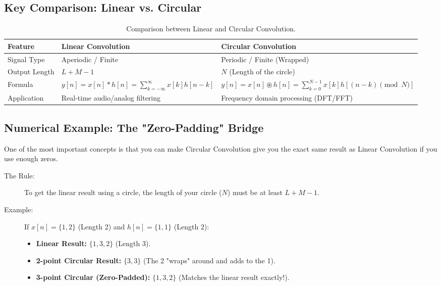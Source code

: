 \documentclass[12pt,a4paper]{article}
\begin{document}
\subsection*{Key Comparison: Linear vs. Circular}
\begin{table}[h!]
\centering
\begin{tabularx}{\textwidth}{|l|X|X|}
\hline
\textbf{Feature} & \textbf{Linear Convolution} & \textbf{Circular Convolution} \\ \hline
Signal Type & Aperiodic / Finite & Periodic / Finite (Wrapped) \\ \hline
Output Length & \(L + M - 1\) & \(N\) (Length of the circle) \\ \hline
Formula & \(y[n] = x[n] * h[n] = \sum_{k=-\infty}^{\infty} x[k] h[n-k]\) & \(y[n] = x[n] \circledast h[n] = \sum_{k=0}^{N-1} x[k] h[(n-k) \pmod N]\) \\ \hline
Application & Real-time audio/analog filtering & Frequency domain processing (DFT/FFT) \\ \hline
\end{tabularx}
\caption{Comparison between Linear and Circular Convolution.}
\end{table}

\subsection*{Numerical Example: The "Zero-Padding" Bridge}
One of the most important concepts is that you can make Circular Convolution give you the exact same result as Linear Convolution if you use enough zeros.
\begin{description}
    \item[The Rule:] To get the linear result using a circle, the length of your circle (\(N\)) must be at least \(L + M - 1\).
    \item[Example:] If \(x[n] = \{1, 2\}\) (Length 2) and \(h[n] = \{1, 1\}\) (Length 2):
    \begin{itemize}
        \item \textbf{Linear Result:} \(\{1, 3, 2\}\) (Length 3).
        \item \textbf{2-point Circular Result:} \(\{3, 3\}\) (The 2 "wraps" around and adds to the 1).
        \item \textbf{3-point Circular (Zero-Padded):} \(\{1, 3, 2\}\) (Matches the linear result exactly!).
    \end{itemize}
\end{description}
\end{document}

